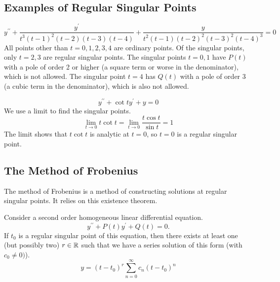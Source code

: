 \documentclass[fleqn,letterpaper]{report}
\begin{document}
\subsection{Examples of Regular Singular Points}
\label{examples-rsp}

\begin{example}
\begin{equation*}
y^{\prime \prime} + \frac{y^\prime}{t^3(t-1)^2(t-2)(t-3)(t-4)} +
\frac{y}{t^2 (t-1)(t-2)^2 (t-3)^2 (t-4)^3} = 0 
\end{equation*}
All points other than $t=0,1,2,3,4$ are ordinary points.
Of the singular points, only $t=2,3$ are regular singular
points. The singular points $t=0,1$ have $P(t)$ with a pole of
order 2 or higher (a square term or worse in the denominator),
which is not allowed. The singular point $t=4$ has $Q(t)$
with a pole of order 3 (a cubic term in the denominator),
which is also not allowed.
\end{example}

\begin{example}
\begin{equation*}
y^{\prime \prime} + \cot t y^\prime + y = 0 
\end{equation*}
We use a limit to find the singular points.
\begin{equation*}
\lim_{t \rightarrow 0} t \cot t = \lim_{t \rightarrow 0} \frac{
t \cos t}{\sin t} = 1
\end{equation*}
The limit shows that $t \cot t$ is analytic at $t=0$, so
$t=0$ is a regular singular point.
\end{example}

\subsection{The Method of Frobenius}
\label{frobenius}

The method of Frobenius is a method of constructing solutions
at regular singular points. It relies on this existence
theorem. 

\begin{thm}
Consider a second order homogeneous linear differential
equation.
\begin{equation*}
y^{\prime \prime} + P(t) y^\prime + Q(t) = 0.
\end{equation*}
If $t_0$ is a regular singular point of this equation, then 
there exists at least one (but possibly two) $r \in \mathbb{R}$ such that
we have a series solution of this form (with $c_0 \neq 0)$).
\begin{equation*}
y = (t-t_0)^r \sum_{n=0}^\infty c_n (t-t_0)^n
\end{equation*}
\end{thm}
\end{document}

